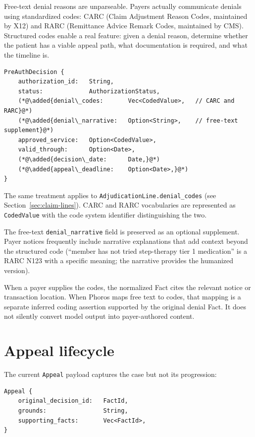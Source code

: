 \documentclass[11pt]{article}
\newcommand{\added}[1]{\textcolor{accentblue}{#1}}
\begin{document}
Free-text denial reasons are unparseable. Payers actually communicate
denials using standardized codes: CARC (Claim Adjustment Reason Codes,
maintained by X12) and RARC (Remittance Advice Remark Codes, maintained
by CMS). Structured codes enable a real feature: given a denial reason,
determine whether the patient has a viable appeal path, what
documentation is required, and what the timeline is.

\begin{lstlisting}
PreAuthDecision {
    authorization_id:   String,
    status:             AuthorizationStatus,
    (*@\added{denial\_codes:       Vec<CodedValue>,   // CARC and RARC}@*)
    (*@\added{denial\_narrative:   Option<String>,    // free-text supplement}@*)
    approved_service:   Option<CodedValue>,
    valid_through:      Option<Date>,
    (*@\added{decision\_date:      Date,}@*)
    (*@\added{appeal\_deadline:    Option<Date>,}@*)
}
\end{lstlisting}

The same treatment applies to \texttt{AdjudicationLine.denial\_codes}
(see Section~\ref{sec:claim-lines}). CARC and RARC vocabularies are
represented as \texttt{CodedValue} with the code system identifier
distinguishing the two.

The free-text \texttt{denial\_narrative} field is preserved as an
optional supplement. Payer notices frequently include narrative
explanations that add context beyond the structured code (``member has
not tried step-therapy tier 1 medication'' is a RARC N123 with a
specific meaning; the narrative provides the humanized version).

When a payer supplies the codes, the normalized Fact cites the relevant notice
or transaction location. When Phoros maps free text to codes, that mapping is
a separate inferred coding assertion supported by the original denial Fact.
It does not silently convert model output into payer-authored content.

\section{Appeal lifecycle}
\label{sec:appeal-lifecycle}

The current \texttt{Appeal} payload captures the case but not its
progression:

\begin{lstlisting}
Appeal {
    original_decision_id:   FactId,
    grounds:                String,
    supporting_facts:       Vec<FactId>,
}
\end{lstlisting}
\end{document}
